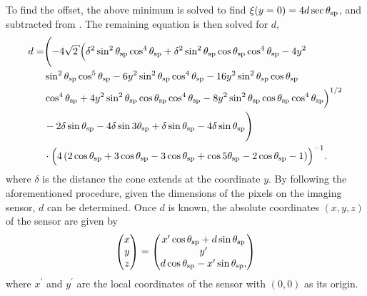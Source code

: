 To find the offset, the above minimum is solved to find $\xi(y=0) = 4 d
  \sec\theta_\mathrm{sp}$, and subtracted from .  The remaining
equation is then solved for $d$,
\begin{align}
  d = & \Biggl(-4 \sqrt{2} \Bigl(\delta^2 \sin ^2\thetasp \cos
    ^4\thetasp+\delta^2 \sin ^2\thetasp \cos \thetasp \cos ^4\thetasp-4 y^2 \nonumber                                 \\
      & \sin ^2\thetasp \cos ^5\thetasp-6 y^2 \sin ^2\thetasp
    \cos ^4\thetasp-16 y^2 \sin ^2\thetasp \cos \thetasp \nonumber                                                    \\
      & \cos ^4\thetasp+4 y^2 \sin ^2\thetasp \cos \thetasp
    \cos ^4\thetasp-8 y^2 \sin ^2\thetasp \cos \thetasp \cos
    ^4\thetasp\Bigr)^{1/2} \nonumber                                                                                  \\
      & -2 \delta\sin \thetasp-4 \delta \sin 3 \thetasp+\delta  \sin \thetasp-4 \delta \sin \thetasp\Biggr) \nonumber \\
      & \cdot\Bigl(4 \left(2 \cos \thetasp+3 \cos \thetasp-3 \cos \thetasp+\cos 5
  \thetasp-2 \cos \thetasp-1\right)\Bigr)^{-1}.
\end{align}
where $\delta$ is the distance the cone extends at the coordinate $y$.
By following the aforementioned procedure, given the dimensions of the pixels on the imaging sensor, $d$
can be determined.  Once $d$ is known, the absolute coordinates $(x,y,z)$ of the
sensor are given by
\begin{equation}
  \begin{pmatrix}
    x \\
    y \\
    z
  \end{pmatrix}
  =
  \begin{pmatrix}
    x^\prime \cos\theta_\mathrm{sp} + d \sin\theta_\mathrm{sp}  \\
    y^\prime                                \\
    d \cos\theta_\mathrm{sp} - x^\prime \sin\theta_\mathrm{sp}, \\
  \end{pmatrix}
  \label{eqn:sensorcoordinates}
\end{equation}
where $x^\prime$ and $y^\prime$ are the local coordinates of the sensor
with $(0,0)$ as its origin.

